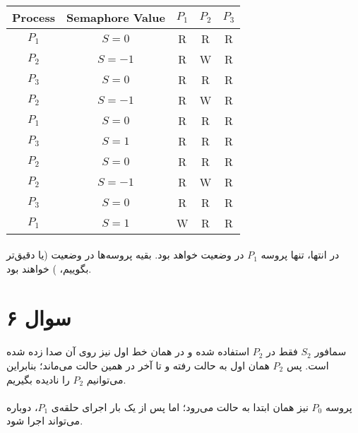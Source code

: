 \documentclass{article}
\begin{document}
	\paragraph*{}
	\begin{latin}
		\centering
		\begin{tabular}{c|c|c|c|c}
			Process & Semaphore Value & $P_1$ & $P_2$ & $P_3$ \\
			\hline
			$P_1$ & $S = 0$ & R & R & R \\
			\hline
			$P_2$ & $S = -1$ & R & W & R \\
			\hline
			$P_3$ & $S = 0$ & R & R & R \\
			\hline
			$P_2$ & $S = -1$ & R & W & R \\
			\hline
			$P_1$ & $S = 0$ & R & R & R \\
			\hline
			$P_3$ & $S = 1$ & R & R & R \\
			\hline
			$P_2$ & $S = 0$ & R & R & R \\
			\hline
			$P_2$ & $S = -1$ & R & W & R \\
			\hline
			$P_3$ & $S = 0$ & R & R & R \\
			\hline
			$P_1$ & $S = 1$ & W & R & R \\
		\end{tabular}
	\end{latin}

	\paragraph*{}
	در انتها، تنها پروسه
	$P_1$
	در وضعیت
	خواهد بود. بقیه پروسه‌ها در وضعیت
	(یا دقیق‌تر بگوییم،
	)
	خواهند بود.

	\section*{سوال ۶}
	\paragraph*{}
	سمافور
	$S_2$
	فقط در
	$P_2$
	استفاده شده و در همان خط اول نیز
	روی آن صدا زده شده است. پس
	$P_2$
	همان اول به حالت
	رفته و تا آخر در همین حالت می‌ماند؛ بنابراین می‌توانیم
	$P_2$
	را نادیده بگیریم.

	\paragraph*{}
	پروسه
	$P_0$
	نیز همان ابتدا به حالت
	می‌رود؛ اما پس از یک بار اجرای حلقه‌ی
	$P_1$،
	دوباره می‌تواند اجرا شود.
\end{document}
